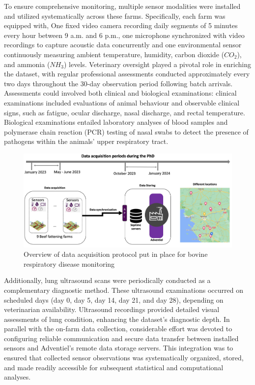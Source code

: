 To ensure comprehensive monitoring, multiple sensor modalities were installed and utilized systematically across these farms. Specifically, each farm was equipped with, One fixed video camera recording daily segments of 5 minutes every hour between 9 a.m. and 6 p.m., one microphone synchronized with video recordings to capture acoustic data concurrently and one environmental sensor continuously measuring ambient temperature, humidity, carbon dioxide ($CO_2$), and ammonia ($NH_3$) levels. Veterinary oversight played a pivotal role in enriching the dataset, with regular professional assessments conducted approximately every two days throughout the 30-day observation period following batch arrivals. Assessments could involved both clinical and biological examinations: clinical examinations included evaluations of animal behaviour and observable clinical signs, such as fatigue, ocular discharge, nasal discharge, and rectal temperature. Biological examinations entailed laboratory analyses of blood samples and polymerase chain reaction (PCR) testing of nasal swabs to detect the presence of pathogens within the animals’ upper respiratory tract.

\begin{figure}[h]
  \includegraphics[width=\linewidth]{figures/chap1/data collection.jpg}
  \caption{Overview of data acquisition protocol put in place for bovine respiratory disease monitoring}
  \label{fig:chap1-DataCollection}
\end{figure}

Additionally, lung ultrasound scans were periodically conducted as a complementary diagnostic method. These ultrasound examinations occurred on scheduled days (day 0, day 5, day 14, day 21, and day 28), depending on veterinarian availability. Ultrasound recordings provided detailed visual assessments of lung condition, enhancing the dataset’s diagnostic depth. In parallel with the on-farm data collection, considerable effort was devoted to configuring reliable communication and secure data transfer between installed sensors and Adventiel's remote data storage servers. This integration was to ensured that collected sensor observations was systematically organized, stored, and made readily accessible for subsequent statistical and computational analyses.

